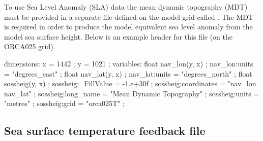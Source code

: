 \documentclass[../main/NEMO_manual]{subfiles}
\begin{document}
To use Sea Level Anomaly (SLA) data the mean dynamic topography (MDT) must be provided in a separate file defined on
the model grid called .
The MDT is required in order to produce the model equivalent sea level anomaly from the model sea surface height.
Below is an example header for this file (on the ORCA025 grid).

\begin{clines}
dimensions:
        x = 1442 ;
        y = 1021 ;
variables:
        float nav_lon(y, x) ;
                nav_lon:units = "degrees_east" ;
        float nav_lat(y, x) ;
                nav_lat:units = "degrees_north" ;
        float sossheig(y, x) ;
                sossheig:_FillValue = -1.e+30f ;
                sossheig:coordinates = "nav_lon nav_lat" ;
                sossheig:long_name = "Mean Dynamic Topography" ;
                sossheig:units = "metres" ;
                sossheig:grid = "orca025T" ;
\end{clines}

\subsection{Sea surface temperature feedback file}
\end{document}
